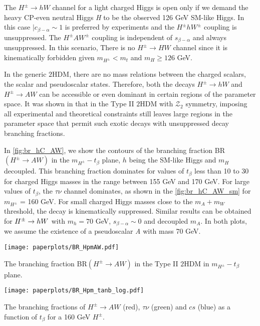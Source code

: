 The $H^{\pm}\rightarrow hW$ channel for a light charged Higgs is open only if we demand the heavy CP-even neutral Higgs \emph{H} to be the observed 126 GeV SM-like Higgs. In this case $|c_{\beta-\alpha} \sim 1$ is preferred by experiments and the $H^{\pm}hW^{\pm}$ coupling is unsuppressed. The $H^{\pm} A W^{\pm}$ coupling is independent of $s_{\beta-\alpha}$ and always unsuppressed. In this scenario, There is no $H^{\pm} \rightarrow HW$ channel since it is kinematically forbidden given $m_{H^{\pm}}<m_t$ and $m_{H}\geq126$ GeV.

In the generic $2$HDM, there are no mass relations between the charged scalars, the scalar and pseudoscalar states. Therefore, both the decays $H^{\pm} \rightarrow h W$ and $H^{\pm} \rightarrow A W$ can be accessible or even dominant in certain regions of the parameter space. It was shown in \cite{Coleppa:2013dya} that in the Type II $2$HDM with $\mathcal{Z}_2$ symmetry, imposing all experimental and theoretical constraints still leaves large regions in the parameter space that permit such exotic decays with unsuppressed decay branching fractions. 

In \autoref{fig:br_hC_AW}, we show the contours of the branching fraction BR$(H^{\pm} \rightarrow A W)$ in the $m_{H^{\pm}}-t_{\beta}$ plane, $h$ being the SM-like Higgs and $m_{H}$ decoupled. This branching fraction dominates for values of $t_{\beta}$ less than 10 to 30 for charged Higgs masses in the range between 155 GeV and 170 GeV. For large values of $t_{\beta}$, the $\tau\nu$ channel dominates, as shown in the \autoref{fig:br_hC_AW_sm} for $m_{H^{\pm}}$ = 160 GeV. For small charged Higgs masses close to the $m_A + m_W$ threshold, the decay is kinematically suppressed. Similar results can be obtained for $H^{\pm} \rightarrow h W$ with $m_{h} = 70$ GeV,  $s_{\beta-\alpha}\sim 0$ and decoupled $m_A$. In both plots, we assume the existence of a pseudoscalar \emph{A} with mass 70 GeV.

\begin{marginfigure}[-8cm]
 	\texttt{[image: paperplots/BR\_HpmAW.pdf]}
    \caption{The branching fraction BR$( H^{\pm} \rightarrow AW)$ in the Type II $2$HDM in $m_{H^\pm}-t_{\beta}$ plane.}
    \label{fig:br_hC_AW}
\end{marginfigure}

\begin{marginfigure}
 	\texttt{[image: paperplots/BR\_Hpm\_tanb\_log.pdf]}
\caption{The branching fractions of $H^{\pm} \rightarrow AW$ (red), $\tau\nu$ (green) and $cs$ (blue) as a function of $t_{\beta}$ for a 160 GeV $H^{\pm}$.}
\label{fig:br_hC_AW_sm}
\end{marginfigure}
 
